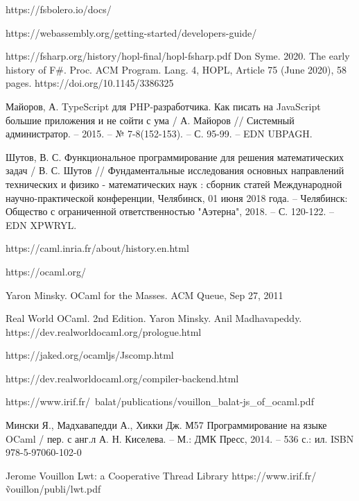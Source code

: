 \begin{thebibliography}{00}
    https://fsbolero.io/docs/ \TODO

    https://webassembly.org/getting-started/developers-guide/ \TODO

    https://fsharp.org/history/hopl-final/hopl-fsharp.pdf 
    Don Syme. 2020. The early history of F\#. Proc. ACM Program. Lang. 4, HOPL, Article 75 (June 2020), 58 pages. https://doi.org/10.1145/3386325
    \TODO

    Майоров, А. TypeScript для PHP-разработчика. Как писать на JavaScript большие приложения и не сойти с ума / 
    А. Майоров // Системный администратор. – 2015. – № 7-8(152-153). – С. 95-99. – EDN UBPAGH.

    Шутов, В. С. Функциональное программирование для решения математических задач 
    / В. С. Шутов // Фундаментальные исследования основных направлений технических и физико - математических наук 
    : сборник статей Международной научно-практической конференции, Челябинск, 01 июня 2018 года. 
    – Челябинск: Общество с ограниченной ответственностью "Аэтерна", 2018. – С. 120-122. – EDN XPWRYL.

    https://caml.inria.fr/about/history.en.html \TODO

    https://ocaml.org/ \TODO

    Yaron Minsky. OCaml for the Masses. ACM Queue, Sep 27, 2011 \TODO

    Real World OCaml. 2nd Edition. Yaron Minsky. Anil Madhavapeddy.
    https://dev.realworldocaml.org/prologue.html \TODO

    https://jaked.org/ocamljs/Jscomp.html \TODO

    https://dev.realworldocaml.org/compiler-backend.html \TODO

    https://www.irif.fr/~balat/publications/vouillon\_balat-js\_of\_ocaml.pdf \TODO

    Мински Я., Мадхавапедди А., Хикки Дж.
    М57 Программирование на языке OCaml / пер. с анг.л А. Н. Киселева. –
    М.: ДМК Пресс, 2014. – 536 с.: ил.
    ISBN 978-5-97060-102-0
    \TODO

    Jerome Vouillon Lwt: a Cooperative Thread Library \TODO
    https://www.irif.fr/\~vouillon/publi/lwt.pdf


\end{thebibliography}

